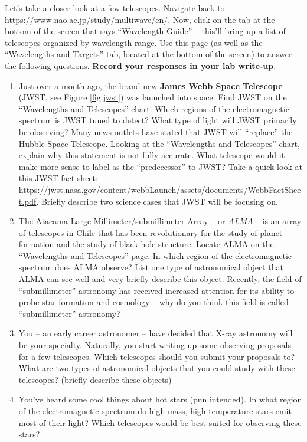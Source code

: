 \documentclass[11pt]{article}
\begin{document}
\medskip \noindent
Let's take a closer look at a few telescopes. Navigate back to \url{https://www.nao.ac.jp/study/multiwave/en/}. Now, click on the tab at the bottom of the screen that says ``Wavelength Guide'' -- this'll bring up a list of telescopes organized by wavelength range. Use this page (as well as the ``Wavelengths and Targets'' tab, located at the bottom of the screen) to answer the following questions. \textbf{Record your responses in your lab write-up}.
\begin{enumerate}
    \item Just over a month ago, the brand new \textbf{James Webb Space Telescope} (JWST, see Figure \ref{fig:jwst}) was launched into space. Find JWST on the ``Wavelengths and Telescopes'' chart. Which regions of the electromagnetic spectrum is JWST tuned to detect? What type of light will JWST primarily be observing? Many news outlets have stated that JWST will ``replace'' the Hubble Space Telescope. Looking at the ``Wavelengths and Telescopes'' chart, explain why this statement is not fully accurate. What telescope would it make more sense to label as the ``predecessor'' to JWST? Take a quick look at this JWST fact sheet: \url{https://jwst.nasa.gov/content/webbLaunch/assets/documents/WebbFactSheet.pdf}. Briefly describe two science cases that JWST will be focusing on.
    
    \item The Atacama Large Millimeter/submillimeter Array -- or \emph{ALMA} -- is an array of telescopes in Chile that has been revolutionary for the study of planet formation and the study of black hole structure. Locate ALMA on the ``Wavelengths and Telescopes'' page. In which region of the electromagnetic spectrum does ALMA observe? List one type of astronomical object that ALMA can see well and very briefly describe this object. Recently, the field of ``submillimeter'' astronomy has received increased attention for its ability to probe star formation and cosmology -- why do you think this field is called ``submillimeter'' astronomy?
    
    \item You -- an early career astronomer -- have decided that X-ray astronomy will be your specialty. Naturally, you start writing up some observing proposals for a few telescopes. Which telescopes should you submit your proposals to? What are two types of astronomical objects that you could study with these telescopes? (briefly describe these objects)     
    \item You've heard some cool things about hot stars (pun intended). In what region of the electromagnetic spectrum do high-mass, high-temperature stars emit most of their light? Which telescopes would be best suited for observing these stars?  
    

\end{enumerate}
\end{document}

